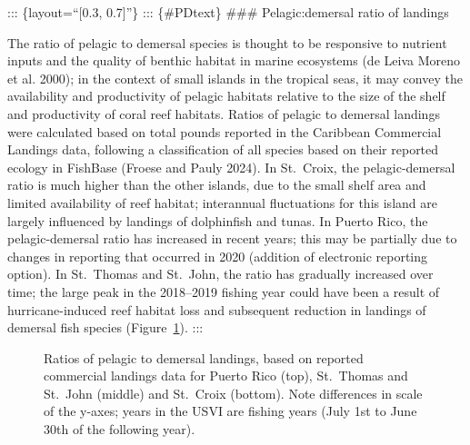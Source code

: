 \documentclass[
  letterpaper,
  oneside,
  open=any]{scrbook}
\begin{document}
::: \{layout=``{[}0.3, 0.7{]}''\} ::: \{\#PDtext\} \#\#\#
Pelagic:demersal ratio of landings

The ratio of pelagic to demersal species is thought to be responsive to
nutrient inputs and the quality of benthic habitat in marine ecosystems
(de Leiva Moreno et al. 2000); in the context of small islands in the
tropical seas, it may convey the availability and productivity of
pelagic habitats relative to the size of the shelf and productivity of
coral reef habitats. Ratios of pelagic to demersal landings were
calculated based on total pounds reported in the Caribbean Commercial
Landings data, following a classification of all species based on their
reported ecology in FishBase (Froese and Pauly 2024). In St.~Croix, the
pelagic-demersal ratio is much higher than the other islands, due to the
small shelf area and limited availability of reef habitat; interannual
fluctuations for this island are largely influenced by landings of
dolphinfish and tunas. In Puerto Rico, the pelagic-demersal ratio has
increased in recent years; this may be partially due to changes in
reporting that occurred in 2020 (addition of electronic reporting
option). In St.~Thomas and St.~John, the ratio has gradually increased
over time; the large peak in the 2018--2019 fishing year could have been
a result of hurricane-induced reef habitat loss and subsequent reduction
in landings of demersal fish species (Figure~\ref{fig-PD}). :::

\label{PDfigure}
\begin{figure}


\caption{\label{fig-PD}Ratios of pelagic to demersal landings, based on
reported commercial landings data for Puerto Rico (top), St.~Thomas and
St.~John (middle) and St.~Croix (bottom). Note differences in scale of
the y-axes; years in the USVI are fishing years (July 1st to June 30th
of the following year).}

\end{figure}%
\end{document}

